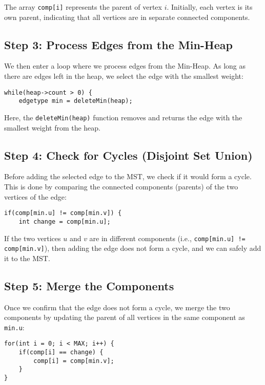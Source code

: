 \documentclass{book}
\begin{document}
The array \texttt{comp[i]} represents the parent of vertex \(i\). Initially, each vertex is its own parent, indicating that all vertices are in separate connected components.

\subsection{Step 3: Process Edges from the Min-Heap}

We then enter a loop where we process edges from the Min-Heap. As long as there are edges left in the heap, we select the edge with the smallest weight:

\begin{verbatim}
while(heap->count > 0) {
    edgetype min = deleteMin(heap);
\end{verbatim}

Here, the \texttt{deleteMin(heap)} function removes and returns the edge with the smallest weight from the heap.

\subsection{Step 4: Check for Cycles (Disjoint Set Union)}

Before adding the selected edge to the MST, we check if it would form a cycle. This is done by comparing the connected components (parents) of the two vertices of the edge:

\begin{verbatim}
if(comp[min.u] != comp[min.v]) {
    int change = comp[min.u];
\end{verbatim}

If the two vertices \(u\) and \(v\) are in different components (i.e., \texttt{comp[min.u] != comp[min.v]}), then adding the edge does not form a cycle, and we can safely add it to the MST.

\subsection{Step 5: Merge the Components}

Once we confirm that the edge does not form a cycle, we merge the two components by updating the parent of all vertices in the same component as \texttt{min.u}:

\begin{verbatim}
for(int i = 0; i < MAX; i++) {
    if(comp[i] == change) {
        comp[i] = comp[min.v];
    }
}
\end{verbatim}
\end{document}
